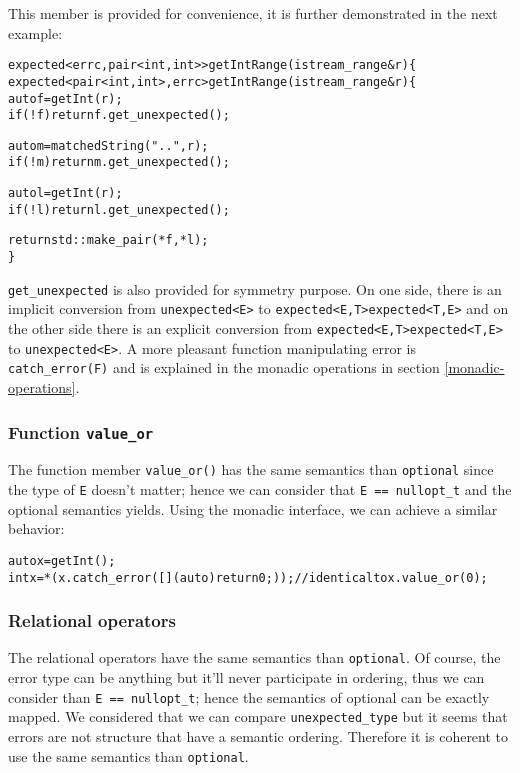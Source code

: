 \documentclass[a4paper,10pt]{article}
\newcommand{\cpp}[1]{\lstinline{#1}}
\newcommand{\suppress}[1]{\colorbox{suppress_color}{#1}}
\newcommand{\update}[1]{\colorbox{update_color}{#1}}
\begin{document}
\noindent
This member is provided for convenience, it is further demonstrated in the next example:

\begin{alltt}
\suppress{expected<errc, pair<int, int>> getIntRange(istream_range& r) \{}
\update{expected<pair<int, int>, errc> getIntRange(istream_range& r) \{}
  auto f = getInt(r);
  if (!f) return f.get_unexpected();

  auto m = matchedString("..", r);
  if (!m) return m.get_unexpected();

  auto l = getInt(r);
  if (!l) return l.get_unexpected();

  return std::make_pair(*f, *l);
\}
\end{alltt}

\cpp{get_unexpected} is also provided for symmetry purpose. On one side, there is an implicit conversion from \cpp{unexpected<E>} to \suppress{\cpp{expected<E,T>}}\update{\cpp{expected<T,E>}} and on the other side there is an explicit conversion from \suppress{\cpp{expected<E,T>}}\update{\cpp{expected<T,E>}} to \cpp{unexpected<E>}. A more pleasant function manipulating error is \cpp{catch_error(F)} and is explained in the monadic operations in section \ref{monadic-operations}.

\subsubsection{Function \cpp{value_or}}

The function member \cpp{value_or()} has the same semantics than \cpp{optional}\cite{OptionalRev4} since the type of \cpp{E} doesn't matter; hence we can consider that \cpp{E == nullopt_t} and the optional semantics yields. Using the monadic interface, we can achieve a similar behavior:

\begin{alltt}
auto x = getInt();
int x = *(x.catch_error([](auto){return 0;})); // identical to x.value_or(0);
\end{alltt}

\subsubsection{Relational operators}

\suppress{The relational operators have the same semantics than \cpp{optional}\cite{OptionalRev5}. Of course, the error type can be anything but it'll never participate in ordering, thus we can consider than \cpp{E == nullopt_t}; hence the semantics of optional can be exactly mapped. We considered that we can compare \cpp{unexpected_type} but it seems that errors are not structure that have a semantic ordering. Therefore it is coherent to use the same semantics than \cpp{optional}.
}
\end{document}
